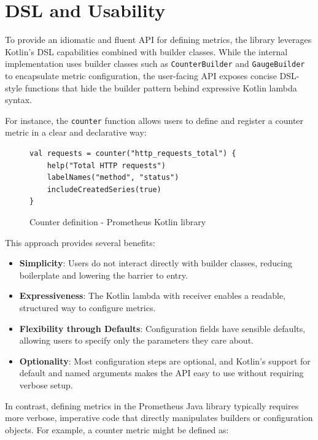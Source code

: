 \section{DSL and Usability}\label{sec:dsl-and-usability}

To provide an idiomatic and fluent \ac{API} for defining metrics, the library leverages Kotlin’s \ac{DSL} capabilities
combined with builder classes.
While the internal implementation uses builder classes such as \texttt{CounterBuilder} and \texttt{GaugeBuilder} to
encapsulate metric configuration, the user-facing \ac{API} exposes concise \ac{DSL}-style functions that hide the
builder pattern behind expressive Kotlin lambda syntax.

For instance, the \texttt{counter} function allows users to define and register a counter metric in a clear and declarative way:

\begin{figure}[h]
    \begin{lstlisting}
val requests = counter("http_requests_total") {
    help("Total HTTP requests")
    labelNames("method", "status")
    includeCreatedSeries(true)
}
    \end{lstlisting}
    \caption{Counter definition - Prometheus Kotlin library}
\end{figure}

This approach provides several benefits:

\begin{itemize}
    \item \textbf{Simplicity}: Users do not interact directly with builder classes, reducing boilerplate and lowering the barrier to entry.
    \item \textbf{Expressiveness}: The Kotlin lambda with receiver enables a readable, structured way to configure metrics.
    \item \textbf{Flexibility through Defaults}: Configuration fields have sensible defaults, allowing users to specify only the parameters they care about.
    \item \textbf{Optionality}: Most configuration steps are optional, and Kotlin’s support for default and named
    arguments makes the \ac{API} easy to use without requiring verbose setup.
\end{itemize}

In contrast, defining metrics in the Prometheus Java library typically requires more verbose, imperative code that
directly manipulates
builders or configuration objects.
For example, a counter metric might be defined as:



